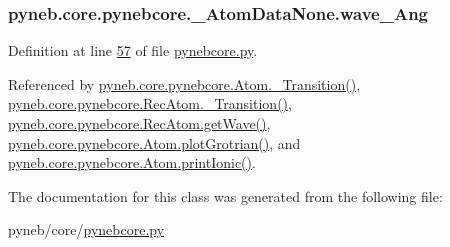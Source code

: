 \hypertarget{classpyneb_1_1core_1_1pynebcore_1_1___atom_data_none_a6a6e8b052741d46963b85c0cdcb9fd79}{}
\subsubsection[{wave\+\_\+\+Ang}]{\setlength{\rightskip}{0pt plus 5cm}pyneb.\+core.\+pynebcore.\+\_\+\+Atom\+Data\+None.\+wave\+\_\+\+Ang}\label{classpyneb_1_1core_1_1pynebcore_1_1___atom_data_none_a6a6e8b052741d46963b85c0cdcb9fd79}


Definition at line \hyperlink{pynebcore_8py_source_l00057}{57} of file \hyperlink{pynebcore_8py_source}{pynebcore.\+py}.



Referenced by \hyperlink{pynebcore_8py_source_l01367}{pyneb.\+core.\+pynebcore.\+Atom.\+\_\+\+Transition()}, \hyperlink{pynebcore_8py_source_l02696}{pyneb.\+core.\+pynebcore.\+Rec\+Atom.\+\_\+\+Transition()}, \hyperlink{pynebcore_8py_source_l02623}{pyneb.\+core.\+pynebcore.\+Rec\+Atom.\+get\+Wave()}, \hyperlink{pynebcore_8py_source_l02372}{pyneb.\+core.\+pynebcore.\+Atom.\+plot\+Grotrian()}, and \hyperlink{pynebcore_8py_source_l02167}{pyneb.\+core.\+pynebcore.\+Atom.\+print\+Ionic()}.



The documentation for this class was generated from the following file\+:\begin{DoxyCompactItemize}
\item 
pyneb/core/\hyperlink{pynebcore_8py}{pynebcore.\+py}\end{DoxyCompactItemize}
